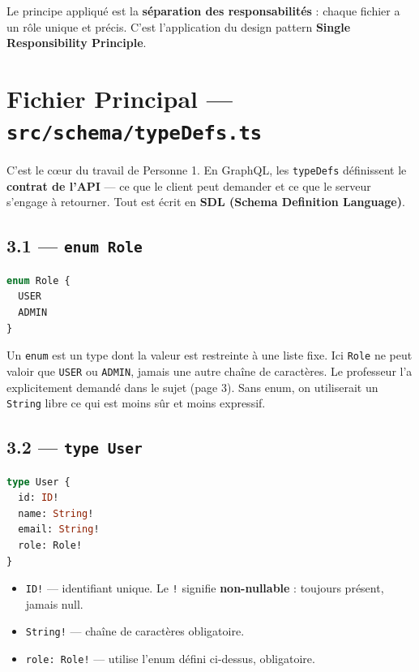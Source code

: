 \documentclass[12pt,a4paper]{article}
\begin{document}
Le principe appliqué est la \textbf{séparation des responsabilités} : chaque fichier a un rôle unique et précis. C'est l'application du design pattern \textbf{Single Responsibility Principle}.

\section{Fichier Principal --- \texttt{src/schema/typeDefs.ts}}

C'est le cœur du travail de Personne 1. En GraphQL, les \texttt{typeDefs} définissent le \textbf{contrat de l'API} --- ce que le client peut demander et ce que le serveur s'engage à retourner. Tout est écrit en \textbf{SDL (Schema Definition Language)}.

\subsection{3.1 --- \texttt{enum Role}}

\begin{lstlisting}[language=GraphQL, caption={Définition de l'enum Role}]
enum Role {
  USER
  ADMIN
}
\end{lstlisting}

Un \texttt{enum} est un type dont la valeur est restreinte à une liste fixe. Ici \texttt{Role} ne peut valoir que \texttt{USER} ou \texttt{ADMIN}, jamais une autre chaîne de caractères. Le professeur l'a explicitement demandé dans le sujet (page 3). Sans enum, on utiliserait un \texttt{String} libre ce qui est moins sûr et moins expressif.

\subsection{3.2 --- \texttt{type User}}

\begin{lstlisting}[language=GraphQL, caption={Type User}]
type User {
  id: ID!
  name: String!
  email: String!
  role: Role!
}
\end{lstlisting}

\begin{itemize}
  \item \texttt{ID!} --- identifiant unique. Le \texttt{!} signifie \textbf{non-nullable} : toujours présent, jamais null.
  \item \texttt{String!} --- chaîne de caractères obligatoire.
  \item \texttt{role: Role!} --- utilise l'enum défini ci-dessus, obligatoire.
\end{itemize}
\end{document}
